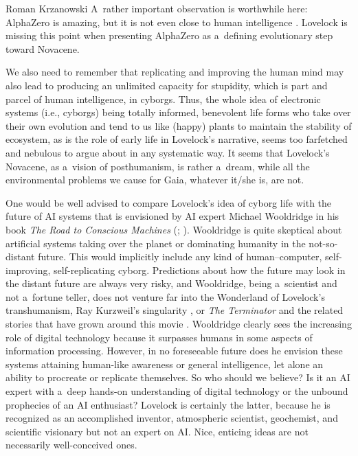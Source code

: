 \begin{newrevengenv}{Roman Krzanowski}
A~rather important observation is worthwhile here: AlphaZero is amazing, but it is not even close to human intelligence
\parencites[e.g.][pp.79–85]{wooldridge_road_2021}[see also][]{krzanowski_road_2021}. %
 Lovelock is missing this point when presenting AlphaZero as a~defining evolutionary step toward Novacene.

We also need to remember that replicating and improving the human mind may also lead to producing an unlimited capacity for stupidity, which is part and parcel of human intelligence, in cyborgs. Thus, the whole idea of electronic systems (i.e., cyborgs) being totally informed, benevolent life forms who take over their own evolution and tend to us like (happy) plants to maintain the stability of ecosystem, as is the role of early life in Lovelock's narrative, seems too farfetched and nebulous to argue about in any systematic way. It seems that Lovelock's Novacene, as a~vision of posthumanism, is rather a~dream, while all the environmental problems we cause for Gaia, whatever it/she is, are not.

One would be well advised to compare Lovelock's idea of cyborg life with the future of AI systems that is envisioned by AI expert Michael Wooldridge in his book \textit{The Road to Conscious Machines}
(\cite*[][]{wooldridge_road_2021}; \cite[cf.][]{krzanowski_road_2021}). %
 Wooldridge is quite skeptical about artificial systems taking over the planet or dominating humanity in the not-so-distant future. This would implicitly include any kind of human–computer, self-improving, self-replicating cyborg. Predictions about how the future may look in the distant future are always very risky, and Wooldridge, being a~scientist and not a~fortune teller, does not venture far into the Wonderland of Lovelock's transhumanism, Ray Kurzweil's singularity 
\parencite[][]{kurzweil_singularity_2005}, %
 or \textit{The Terminator} 
 and the related stories that have grown around this movie 
\parencite[][]{noauthor_terminator_2021}. %
 Wooldridge clearly sees the increasing role of digital technology because it surpasses humans in some aspects of information processing. However, in no foreseeable future does he envision these systems attaining human-like awareness or general intelligence, let alone an ability to procreate or replicate themselves. So who should we believe? Is it an AI expert with a~deep hands-on understanding of digital technology or the unbound prophecies of an AI enthusiast? Lovelock is certainly the latter, because he is recognized as an accomplished inventor, atmospheric scientist, geochemist, and scientific visionary but not an expert on AI. Nice, enticing ideas are not necessarily well-conceived ones.


\end{newrevengenv}
